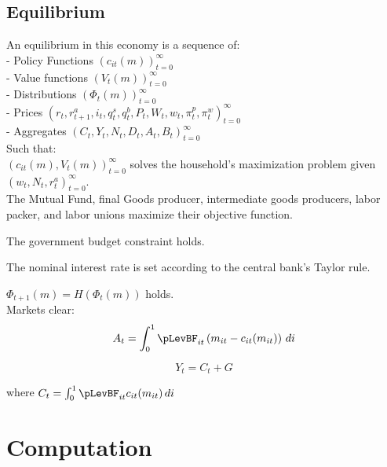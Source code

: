 \documentclass[titlepage]{\econtex}\providecommand{\texname}{BufferStockTheory}
\begin{document}
\hypertarget{Equilibrium}{}
\subsection{Equilibrium}


An equilibrium in this economy is a sequence of: \\

- Policy Functions $\left( c_{it}(m) \right )_{t=0}^{\infty}$ \\

- Value functions $ \left( V_{t}(m) \right)_{t=0}^{\infty}$\\

- Distributions $ \left(\Phi_{t}(m) \right)_{t=0}^{\infty}$\\

- Prices $ \left(r_{t},  r^{a}_{t+1}, i_{t}, q^{s}_{t}, q^{b}_{t}, P_{t}, W_{t} , w_{t} , \pi^{p}_{t}, \pi^{w}_{t} \right) _{t=0}^{\infty}$\\

- Aggregates $ \left(C_{t}, Y_{t} , N_{t}, D_{t} , A_{t} , B_{t} \right)_{t=0}^{\infty}$\\

Such that: \\

$ \left(  c_{it}(m), V_{t}(m)\right)_{t=0}^{\infty}$  solves the household's maximization problem given $  \left( w_{t}, N_{t},  r^{a}_{t} \right)_{t=0}^{\infty}$.\\

The Mutual Fund, final Goods producer, intermediate goods producers, labor packer, and labor unions maximize their objective function.

The government budget constraint holds.

The nominal interest rate is set according to the central bank's Taylor rule.


$ \Phi_{t+1}(m) = H(\Phi_{t}(m))$ holds.\\


Markets clear:\\

 $$ A_t =  \int_{0}^{1} \pLevBF_{it}\left( m_{it} - c_{it}(m_{it})\right) \, di $$
 
 $$ Y_t = C_{t} +G $$
 
 where $C_{t} =  \int_{0}^{1} \pLevBF_{it} c_{it}(m_{it})\, di $


\hypertarget{Computation}{}
\section{Computation}
\end{document}
